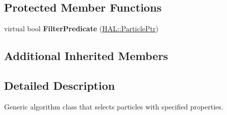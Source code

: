 \subsection*{Protected Member Functions}
\begin{DoxyCompactItemize}
\item 
\hypertarget{class_h_a_l_1_1_algorithms_1_1_select_particle_af19a208179b5c2da43bdd010ec7355cd}{virtual bool {\bfseries Filter\-Predicate} (\hyperlink{class_h_a_l_1_1_generic_particle}{H\-A\-L\-::\-Particle\-Ptr})}\label{class_h_a_l_1_1_algorithms_1_1_select_particle_af19a208179b5c2da43bdd010ec7355cd}

\end{DoxyCompactItemize}
\subsection*{Additional Inherited Members}


\subsection{Detailed Description}
Generic algorithm class that selects particles with specified properties. 

